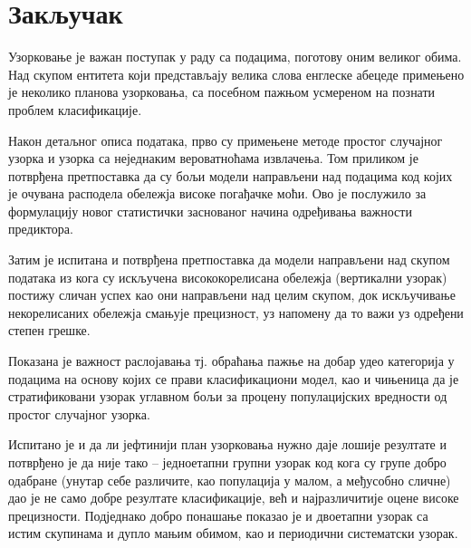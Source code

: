 \documentclass[a4paper]{article}
\begin{document}


\section{Закључак}

Узорковање је важан поступак у раду са подацима, поготову оним великог обима. Над скупом ентитета који представљају велика слова енглеске абецеде примењено је неколико планова узорковања, са посебном пажњом усмереном на познати проблем класификације.

Након детаљног описа података, прво су примењене методе простог случајног узорка и узорка са неједнаким вероватноћама извлачења. Том приликом је потврђена претпоставка да су бољи модели направљени над подацима код којих је очувана расподела обележја високе погађачке моћи. Ово је послужило за формулацију новог статистички заснованог начина одређивања важности предиктора.

Затим је испитана и потврђена претпоставка да модели направљени над скупом података из кога су искључена висококорелисана обележја (вертикални узорак) постижу сличан успех као они направљени над целим скупом, док искључивање некорелисаних обележја смањује прецизност, уз напомену да то важи уз одређени степен грешке.

Показана је важност раслојавања тј. обраћања пажње на добар удео категорија у подацима на основу којих се прави класификациони модел, као и чињеница да је стратификовани узорак углавном бољи за процену популацијских вредности од простог случајног узорка.

Испитано је и да ли јефтинији план узорковања нужно даје лошије резултате и потврђено је да није тако -- једноетапни групни узорак код кога су групе добро одабране (унутар себе различите, као популација у малом, а међусобно сличне) дао је не само добре резултате класификације, већ и најразличитије оцене високе прецизности. Подједнако добро понашање показао је и двоетапни узорак са истим скупинама и дупло мањим обимом, као и периодични систематски узорак.
\end{document}

